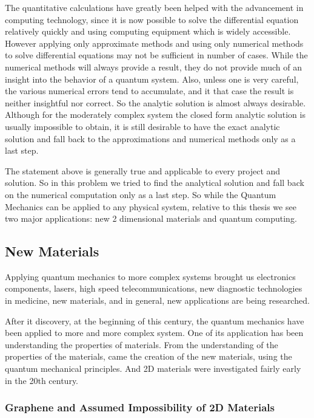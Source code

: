 The quantitative calculations have greatly been helped with the advancement in computing technology, since it is now possible to solve the differential equation relatively quickly and using computing equipment which is widely accessible.  However applying only approximate methods and using only numerical methods to solve differential equations may not be sufficient in number of cases. While the numerical methods will always provide a result, they do not provide much of an insight into the behavior of a quantum system. Also, unless one is very careful, the various numerical errors tend to accumulate, and it that case the result is neither insightful nor correct. So the analytic solution is almost always desirable. Although for the moderately complex system the closed form analytic solution is usually impossible to obtain, it is still desirable to have the exact analytic solution and fall back to the approximations and numerical methods only as a last step.

The statement above is generally true and applicable to every project and solution. So in this problem we tried to find the analytical solution and fall back on the numerical computation only as a last step. So while the Quantum Mechanics can be applied to any physical system, relative to this thesis we see two major applications: new 2 dimensional materials and quantum computing.

\subsection*{New Materials}

Applying quantum mechanics to more complex systems brought us electronics components, lasers, high speed telecommunications, new diagnostic technologies in medicine, new materials, and in general, new applications are being researched.

After it discovery, at the beginning of this century, the quantum mechanics have been applied to more and more complex system. One of its application has been understanding the properties of materials.
From the understanding of the properties of the materials, came the creation of the new materials, using the quantum mechanical principles. And 2D materials were investigated fairly early in the 20th century.

\subsubsection{Graphene and Assumed Impossibility of 2D Materials}

